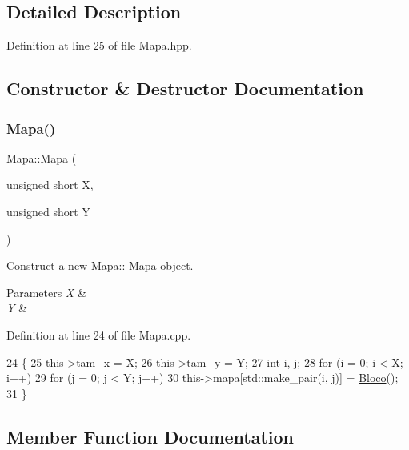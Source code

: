 \subsection{Detailed Description}


Definition at line 25 of file Mapa.\+hpp.



\subsection{Constructor \& Destructor Documentation}
\mbox{\label{class_mapa_ad722918f4e9150eb37d27de9f2847d5c}} 
\subsubsection{\texorpdfstring{Mapa()}{Mapa()}}
{\footnotesize\ttfamily Mapa\+::\+Mapa (\begin{DoxyParamCaption}\item[{unsigned short}]{X,  }\item[{unsigned short}]{Y }\end{DoxyParamCaption})}



Construct a new \mbox{\hyperlink{class_mapa}{Mapa}}\+:\+: \mbox{\hyperlink{class_mapa}{Mapa}} object. 


\begin{DoxyParams}{Parameters}
{\em X} & \\
\hline
{\em Y} & \\
\hline
\end{DoxyParams}


Definition at line 24 of file Mapa.\+cpp.


\begin{DoxyCode}
24                                              \{
25     this->tam\_x = X;
26     this->tam\_y = Y;
27     \textcolor{keywordtype}{int} i, j;
28     \textcolor{keywordflow}{for} (i = 0; i < X; i++)
29         \textcolor{keywordflow}{for} (j = 0; j < Y; j++)
30             this->mapa[std::make\_pair(i, j)] = \mbox{\hyperlink{class_bloco}{Bloco}}();
31 \}
\end{DoxyCode}


\subsection{Member Function Documentation}
\mbox{\label{class_mapa_a4dbab5cd3008b39687d8d2edb0ebacee}} 
